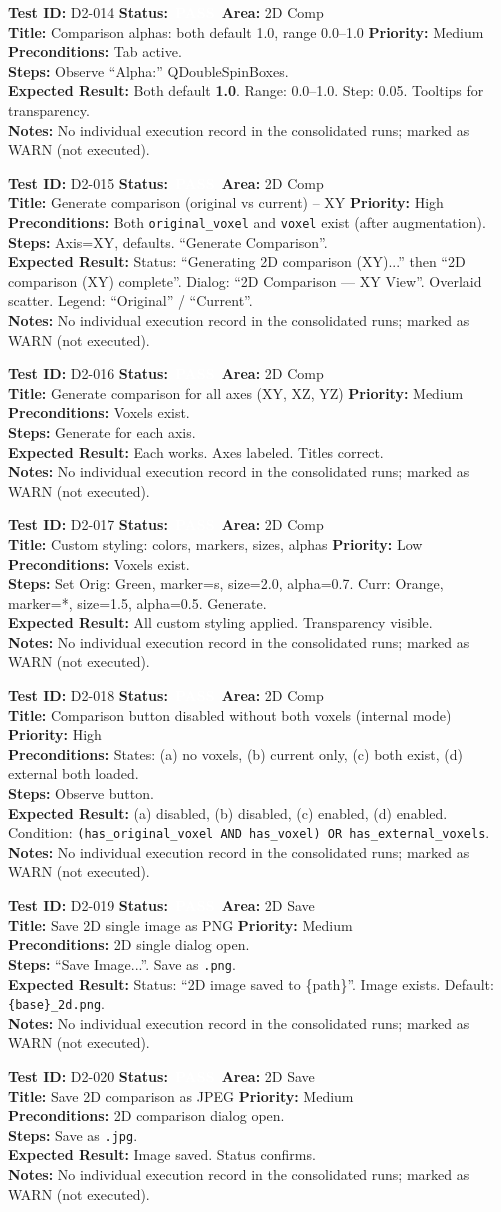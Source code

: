 \documentclass[12pt,a4paper]{article}
\newcommand{\statuspass}{\colorbox{statusgreen}{\textcolor{white}{\textbf{\,PASS\,}}}}
\newcommand{\testcase}[9]{%
  \smallskip
  \noindent\textbf{Test ID:} #1 \hfill \textbf{Status:} #2 \hfill \textbf{Area:} #3 \\
  \textbf{Title:} #4 \hfill \textbf{Priority:} #5 \\[0.3em]
  \textbf{Preconditions:} #6 \\[0.3em]
  \textbf{Steps:} #7 \\[0.3em]
  \textbf{Expected Result:} #8 \\
  \textbf{Notes:} #9
  \smallskip
}
\begin{document}
\testcase{D2-014}{\statuspass}{2D Comp}{Comparison alphas: both default 1.0, range 0.0--1.0}{Medium}{Tab active.}{Observe ``Alpha:'' QDoubleSpinBoxes.}{Both default \textbf{1.0}. Range: 0.0--1.0. Step: 0.05. Tooltips for transparency.}{No individual execution record in the consolidated runs; marked as WARN (not executed).}


\testcase{D2-015}{\statuspass}{2D Comp}{Generate comparison (original vs current) -- XY}{High}{Both \texttt{original\_voxel} and \texttt{voxel} exist (after augmentation).}{Axis=XY, defaults. ``Generate Comparison''.}{Status: ``Generating 2D comparison (XY)...'' then ``2D comparison (XY) complete''. Dialog: ``2D Comparison --- XY View''. Overlaid scatter. Legend: ``Original'' / ``Current''.}{No individual execution record in the consolidated runs; marked as WARN (not executed).}


\testcase{D2-016}{\statuspass}{2D Comp}{Generate comparison for all axes (XY, XZ, YZ)}{Medium}{Voxels exist.}{Generate for each axis.}{Each works. Axes labeled. Titles correct.}{No individual execution record in the consolidated runs; marked as WARN (not executed).}


\testcase{D2-017}{\statuspass}{2D Comp}{Custom styling: colors, markers, sizes, alphas}{Low}{Voxels exist.}{Set Orig: Green, marker=s, size=2.0, alpha=0.7. Curr: Orange, marker=*, size=1.5, alpha=0.5. Generate.}{All custom styling applied. Transparency visible.}{No individual execution record in the consolidated runs; marked as WARN (not executed).}


\testcase{D2-018}{\statuspass}{2D Comp}{Comparison button disabled without both voxels (internal mode)}{High}{States: (a) no voxels, (b) current only, (c) both exist, (d) external both loaded.}{Observe button.}{(a) disabled, (b) disabled, (c) enabled, (d) enabled. Condition: \texttt{(has\_original\_voxel AND has\_voxel) OR has\_external\_voxels}.}{No individual execution record in the consolidated runs; marked as WARN (not executed).}


\testcase{D2-019}{\statuspass}{2D Save}{Save 2D single image as PNG}{Medium}{2D single dialog open.}{``Save Image...''. Save as \texttt{.png}.}{Status: ``2D image saved to \{path\}''. Image exists. Default: \texttt{\{base\}\_2d.png}.}{No individual execution record in the consolidated runs; marked as WARN (not executed).}


\testcase{D2-020}{\statuspass}{2D Save}{Save 2D comparison as JPEG}{Medium}{2D comparison dialog open.}{Save as \texttt{.jpg}.}{Image saved. Status confirms.}{No individual execution record in the consolidated runs; marked as WARN (not executed).}
\end{document}
